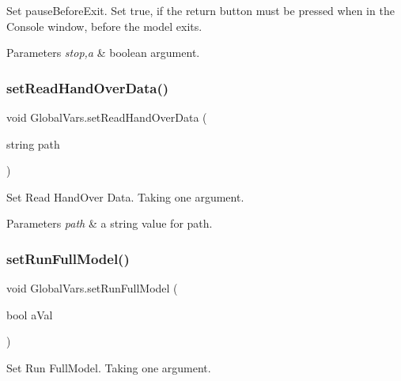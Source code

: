 Set pause\+Before\+Exit. Set true, if the return button must be pressed when in the Console window, before the model exits. 


\begin{DoxyParams}{Parameters}
{\em stop,a} & boolean argument. \\
\hline
\end{DoxyParams}
\mbox{\label{class_global_vars_a3d2a46ab9111e91ec5d7108f3b6bb949}} 
\subsubsection{\texorpdfstring{setReadHandOverData()}{setReadHandOverData()}}
{\footnotesize\ttfamily void Global\+Vars.\+set\+Read\+Hand\+Over\+Data (\begin{DoxyParamCaption}\item[{string}]{path }\end{DoxyParamCaption})\hspace{0.3cm}{\ttfamily [inline]}}



Set Read Hand\+Over Data. Taking one argument. 


\begin{DoxyParams}{Parameters}
{\em path} & a string value for path. \\
\hline
\end{DoxyParams}
\mbox{\label{class_global_vars_ab3a4996343d225c668511fb607588ee6}} 
\subsubsection{\texorpdfstring{setRunFullModel()}{setRunFullModel()}}
{\footnotesize\ttfamily void Global\+Vars.\+set\+Run\+Full\+Model (\begin{DoxyParamCaption}\item[{bool}]{a\+Val }\end{DoxyParamCaption})\hspace{0.3cm}{\ttfamily [inline]}}



Set Run Full\+Model. Taking one argument. 


